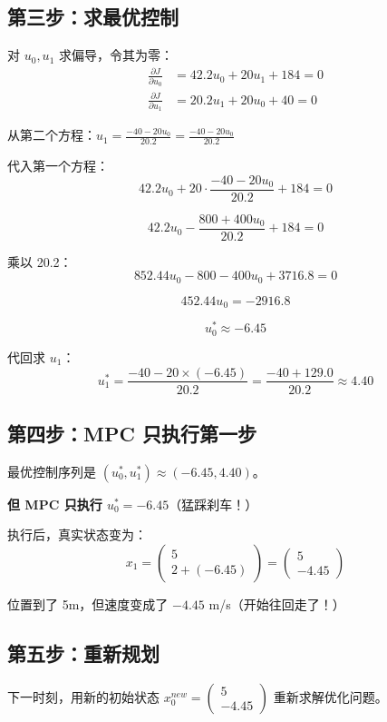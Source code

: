 \subsection{第三步：求最优控制}

对 $u_0, u_1$ 求偏导，令其为零：
\begin{align}
\frac{\partial J}{\partial u_0} &= 42.2 u_0 + 20 u_1 + 184 = 0 \\
\frac{\partial J}{\partial u_1} &= 20.2 u_1 + 20 u_0 + 40 = 0
\end{align}

从第二个方程：$u_1 = \frac{-40 - 20 u_0}{20.2} = \frac{-40 - 20 u_0}{20.2}$

代入第一个方程：
\[
42.2 u_0 + 20 \cdot \frac{-40 - 20 u_0}{20.2} + 184 = 0
\]

\[
42.2 u_0 - \frac{800 + 400 u_0}{20.2} + 184 = 0
\]

乘以 20.2：
\[
852.44 u_0 - 800 - 400 u_0 + 3716.8 = 0
\]

\[
452.44 u_0 = -2916.8
\]

\[
u_0^* \approx -6.45
\]

代回求 $u_1$：
\[
u_1^* = \frac{-40 - 20 \times (-6.45)}{20.2} = \frac{-40 + 129.0}{20.2} \approx 4.40
\]

\subsection{第四步：MPC 只执行第一步}

最优控制序列是 $(u_0^*, u_1^*) \approx (-6.45, 4.40)$。

\textbf{但 MPC 只执行 $u_0^* = -6.45$}（猛踩刹车！）

执行后，真实状态变为：
\[
x_1 = \begin{pmatrix} 5 \\ 2 + (-6.45) \end{pmatrix} = \begin{pmatrix} 5 \\ -4.45 \end{pmatrix}
\]

位置到了 5m，但速度变成了 $-4.45$ m/s（开始往回走了！）

\subsection{第五步：重新规划}

下一时刻，用新的初始状态 $x_0^{new} = \begin{pmatrix} 5 \\ -4.45 \end{pmatrix}$ 重新求解优化问题。


